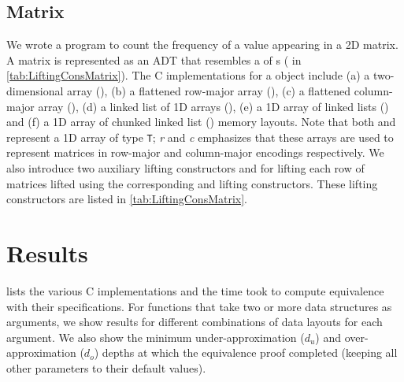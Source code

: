 

\subsection{Matrix}
\label{sec:expmat}
We wrote a \SpecL{} program to count the frequency of a value appearing in a 2D matrix.
A matrix is represented as an ADT that resembles a  of s ( in \cref{tab:LiftingConsMatrix}).
The C implementations for a  object include
(a) a two-dimensional array (), (b) a flattened row-major array (),
(c) a flattened column-major array (), (d) a linked list of 1D arrays (),
(e) a 1D array of linked lists () and (f) a 1D array of chunked linked list ()
memory layouts. Note that both  and  represent a 1D array of type {\tt T}; {\em r} and {\em c}
emphasizes that these arrays are used to represent matrices in row-major and column-major encodings respectively.
We also introduce two auxiliary lifting constructors  and 
for lifting each row of matrices lifted using the corresponding  and   lifting
constructors. These lifting constructors are listed in \cref{tab:LiftingConsMatrix}.

   

\section{Results}
\label{sec:results}
 lists the various C implementations and the time \toolName{} took
to compute equivalence with their specifications. For functions that
take two or more data structures as arguments, we show
results for different combinations of data layouts for each argument.
We also show the minimum under-approximation ($d_u$) and over-approximation ($d_o$) depths
at which the equivalence proof completed (keeping all other parameters to their
default values).

